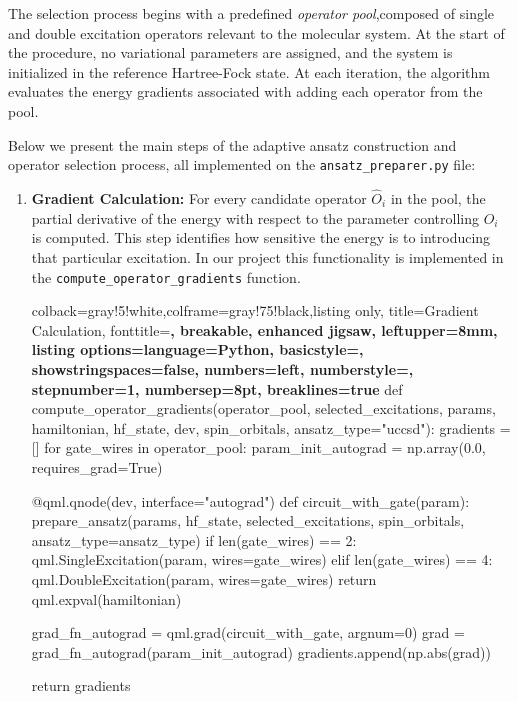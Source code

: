The selection process begins with a predefined \textit{operator pool},composed of single and double excitation operators relevant to the molecular system. At the start of the procedure, no variational parameters are assigned, and the system is initialized in the reference Hartree-Fock state. At each iteration, the algorithm evaluates the energy gradients associated with adding each operator from the pool.

Below we present the main steps of the adaptive ansatz construction and operator selection process, all implemented on the \texttt{ansatz\_preparer.py} file:

\begin{enumerate}
    \item \textbf{Gradient Calculation:} For every candidate operator $\hat{O}_i$ in the pool, the partial derivative of the energy with respect to the parameter controlling $\hat{O}_i$ is computed. This step identifies how sensitive the energy is to introducing that particular excitation. In our project this functionality is implemented in the \texttt{compute\_operator\_gradients} function.
    \begin{tcblisting}{colback=gray!5!white,colframe=gray!75!black,listing only,
        title=Gradient Calculation, fonttitle=\bfseries, breakable, enhanced jigsaw, leftupper=8mm,
        listing options={language=Python, basicstyle=\ttfamily\small,
        showstringspaces=false, numbers=left, numberstyle=\footnotesize, stepnumber=1, numbersep=8pt, breaklines=true}}
def compute_operator_gradients(operator_pool, selected_excitations, params, hamiltonian, hf_state, dev, spin_orbitals, ansatz_type="uccsd"): 
    gradients = []
    for gate_wires in operator_pool:
        param_init_autograd = np.array(0.0, requires_grad=True)
    
        @qml.qnode(dev, interface="autograd")
        def circuit_with_gate(param):
            prepare_ansatz(params, hf_state, selected_excitations, spin_orbitals, ansatz_type=ansatz_type)
            if len(gate_wires) == 2:
                qml.SingleExcitation(param, wires=gate_wires)
            elif len(gate_wires) == 4:
                qml.DoubleExcitation(param, wires=gate_wires)
            return qml.expval(hamiltonian)
    
        grad_fn_autograd = qml.grad(circuit_with_gate, argnum=0)
        grad = grad_fn_autograd(param_init_autograd)
        gradients.append(np.abs(grad))
    
    return gradients
      \end{tcblisting}
    

\end{enumerate}
